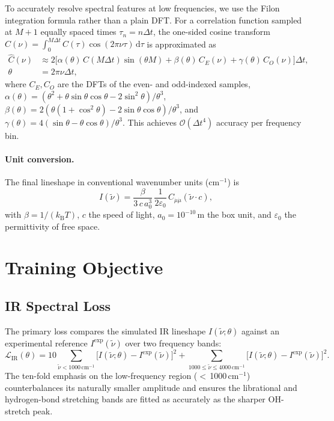 \documentclass{article}
\newcommand{\dd}{\,\mathrm{d}}
\newcommand{\kB}{k_{\mathrm{B}}}
\begin{document}
To accurately resolve spectral features at low frequencies, we use the Filon
integration formula \cite{filon1928} rather than a plain DFT.  For a
correlation function sampled at $M+1$ equally spaced times
$\tau_n = n\Delta t$, the one-sided cosine transform
$\hat{C}(\nu) = \int_0^{M\Delta t} C(\tau)\cos(2\pi\nu\tau)\dd\tau$
is approximated as
\begin{align}
  \hat{C}(\nu) &\approx
    2\bigl[\alpha(\theta)\,C(M\Delta t)\sin(\theta M)
           + \beta(\theta)\,C_E(\nu)
           + \gamma(\theta)\,C_O(\nu)\bigr]\Delta t, \label{eq:filon}\\
  \theta &= 2\pi\nu\Delta t,\nonumber
\end{align}
where $C_E, C_O$ are the DFTs of the even- and odd-indexed samples,
$\alpha(\theta) = (\theta^2 + \theta\sin\theta\cos\theta - 2\sin^2\theta)/\theta^3$,
$\beta(\theta)  = 2(\theta(1+\cos^2\theta) - 2\sin\theta\cos\theta)/\theta^3$, and
$\gamma(\theta) = 4(\sin\theta - \theta\cos\theta)/\theta^3$.
This achieves $\mathcal{O}(\Delta t^4)$ accuracy per frequency bin.

\paragraph{Unit conversion.}
The final lineshape in conventional wavenumber units (cm$^{-1}$) is
\begin{equation}
  I(\tilde\nu)
  = \frac{\beta}{3\,c\,a_0^3}\,\frac{1}{2\varepsilon_0}\,
    \hat{C}_{\dot{\mu}\dot{\mu}}\!\left(\tilde\nu\cdot c\right),
\end{equation}
with $\beta = 1/(\kB T)$, $c$ the speed of light, $a_0 = 10^{-10}$\,m the
box unit, and $\varepsilon_0$ the permittivity of free space.

\section{Training Objective}
\label{sec:loss}

\subsection{IR Spectral Loss}

The primary loss compares the simulated IR lineshape $I(\tilde\nu;\theta)$
against an experimental reference $I^\mathrm{exp}(\tilde\nu)$ over two
frequency bands:
\begin{equation}
  \label{eq:irloss}
  \mathcal{L}_\mathrm{IR}(\theta)
  = 10\sum_{\tilde\nu < 1000\,\mathrm{cm}^{-1}}
      \bigl[I(\tilde\nu;\theta) - I^\mathrm{exp}(\tilde\nu)\bigr]^2
    + \sum_{1000 \le \tilde\nu \le 4000\,\mathrm{cm}^{-1}}
      \bigl[I(\tilde\nu;\theta) - I^\mathrm{exp}(\tilde\nu)\bigr]^2.
\end{equation}
The ten-fold emphasis on the low-frequency region ($<$\,1000\,cm$^{-1}$)
counterbalances its naturally smaller amplitude and ensures the librational
and hydrogen-bond stretching bands are fitted as accurately as the sharper
OH-stretch peak.
\end{document}
